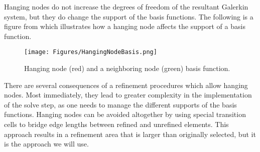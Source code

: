 \documentclass[12 pt]{report}
\begin{document}
Hanging nodes do not increase the degrees of freedom of the resultant Galerkin system, but they do change the support of the basis functions. The following is a figure from \citet[Chapter 4]{bangerth_adaptive_2003} which illustrates how a hanging node affects the support of a basis function. 
\begin{figure}[H]
  \centering
  \texttt{[image: Figures/HangingNodeBasis.png]}
  \caption{Hanging node (red) and a neighboring node (green) basis function.}
\end{figure}
There are several consequences of a refinement procedures which allow hanging nodes. Most immediately, they lead to greater complexity in the implementation of the solve step, as one needs to manage the different supports of the basis functions. Hanging nodes can be avoided altogether by using special transition cells to bridge edge lengths between refined and unrefined elements. This approach results in a refinement area that is larger than originally selected, but it is the approach we will use. 
\captionsetup[subfigure]{justification=centering}
\end{document}
